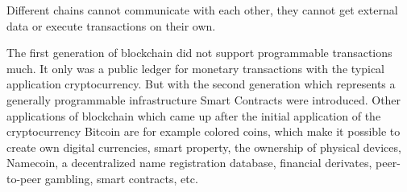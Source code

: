 \documentclass[conference]{IEEEtran}
\begin{document}
Different chains cannot communicate with each other, they cannot get external data or execute transactions on their own.\cite{Wang2017}\par
The first generation of blockchain did not support programmable transactions much. It only was a public ledger for monetary transactions with the typical application cryptocurrency. But with the second generation which represents a generally programmable infrastructure Smart Contracts were introduced.\cite{Xu2016} Other applications of blockchain which came up after the initial application of the cryptocurrency Bitcoin are for example colored coins, which make it possible to create own digital currencies, smart property, the ownership of physical devices, Namecoin, a decentralized name registration database, financial derivates, peer-to-peer gambling, smart contracts, etc.\cite{Buterin2014}
\end{document}

